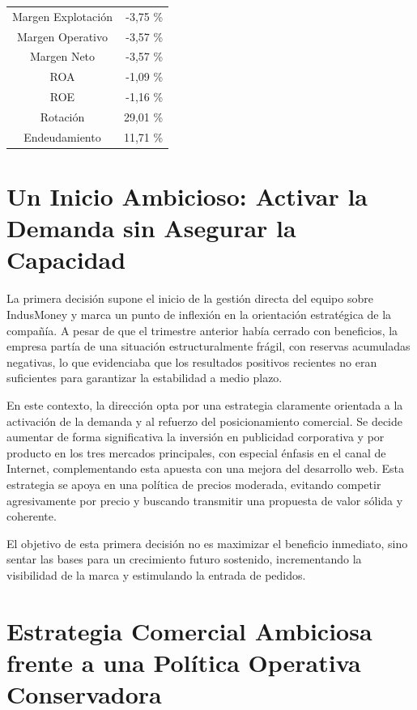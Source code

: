 \begin{table}[h]
    \centering
    \begin{tabular}{|c|r|}
        \hline
        Margen Explotación  & -3,75 \% \\
        Margen Operativo    & -3,57 \% \\
        Margen Neto         & -3,57 \% \\
        ROA                 & -1,09 \% \\
        ROE                 & -1,16 \% \\
        Rotación            & 29,01 \% \\
        Endeudamiento       & 11,71 \% \\
        \hline
    \end{tabular}
\end{table}

\section*{Un Inicio Ambicioso: Activar la Demanda sin Asegurar la Capacidad}

La primera decisión supone el inicio de la gestión directa del equipo sobre IndusMoney y marca un punto de inflexión en la orientación estratégica de la compañía. A pesar de que el trimestre anterior había cerrado con beneficios, la empresa partía de una situación estructuralmente frágil, con reservas acumuladas negativas, lo que evidenciaba que los resultados positivos recientes no eran suficientes para garantizar la estabilidad a medio plazo.

En este contexto, la dirección opta por una estrategia claramente orientada a la activación de la demanda y al refuerzo del posicionamiento comercial. Se decide aumentar de forma significativa la inversión en publicidad corporativa y por producto en los tres mercados principales, con especial énfasis en el canal de Internet, complementando esta apuesta con una mejora del desarrollo web. Esta estrategia se apoya en una política de precios moderada, evitando competir agresivamente por precio y buscando transmitir una propuesta de valor sólida y coherente.

El objetivo de esta primera decisión no es maximizar el beneficio inmediato, sino sentar las bases para un crecimiento futuro sostenido, incrementando la visibilidad de la marca y estimulando la entrada de pedidos.

\section*{Estrategia Comercial Ambiciosa frente a una Política Operativa Conservadora}

